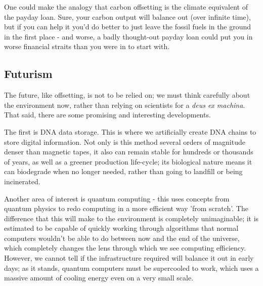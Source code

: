 \documentclass{article}
\begin{document}
One could make the analogy that carbon offsetting is the climate equivalent of the payday loan. Sure, your carbon output will balance out (over infinite time), but if you can help it you'd do better to just leave the fossil fuels in the ground in the first place - and worse, a badly thought-out payday loan could put you in worse financial straits than you were in to start with.

\subsection{Futurism}
The future, like offsetting, is not to be relied on; we must think carefully about the environment now, rather than relying on scientists for a \emph{deus ex machina}. That said, there are some promising and interesting developments.\newline

The first is DNA data storage. This is where we artificially create DNA chains to store digital information. Not only is this method several orders of magnitude denser than magnetic tapes, it also can remain stable for hundreds or thousands of years, as well as a greener production life-cycle; its biological nature means it can biodegrade when no longer needed, rather than going to landfill or being incinerated. \citep{nguyen2020architecting}\newline

Another area of interest is quantum computing - this uses concepts from quantum physics to redo computing in a more efficient way 'from scratch'. The difference that this will make to the environment is completely unimaginable; it is estimated to be capable of quickly working through algorithms that normal computers wouldn't be able to do between now and the end of the universe, which completely changes the lens through which we see computing efficiency. However, we cannot tell if the infrastructure required will balance it out in early days; as it stands, quantum computers must be supercooled to work, which uses a massive amount of cooling energy even on a very small scale.
\end{document}
